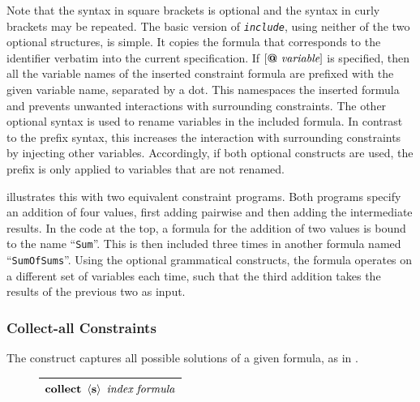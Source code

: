     \noindent
    Note that the syntax in square brackets  is optional and the syntax in curly
    brackets may be repeated.
    The basic version of \texttt{\it include}, using neither of the two optional
    structures, is simple.
    It copies the formula that corresponds to the identifier verbatim into
    the current specification.
    If $[\text{\bf @}\ \text{\it variable}]$ is specified, then all the
    variable names of the inserted constraint formula are prefixed with the
    given variable name, separated by a dot.
    This namespaces the inserted formula and prevents unwanted
    interactions with surrounding constraints.
    The other optional syntax is used to rename variables in the included
    formula.
    In contrast to the prefix syntax, this increases the interaction with
    surrounding constraints by injecting other variables.
    Accordingly, if both optional constructs are used, the prefix is only
    applied to variables that are not renamed.

     illustrates this with two
    equivalent constraint programs.
    Both programs specify an addition of four values, first adding pairwise and
    then adding the intermediate results.
    In the code at the top, a formula for the addition of two values is
    bound to the name ``{\tt Sum}''.
    This is then included three times in another formula named
    ``{\tt SumOfSums}''.
    Using the optional grammatical constructs, the formula operates on a
    different set of variables each time, such that the third addition
    takes the results of the previous two as input.

\begin{figure}[h]

\end{figure}

\subsubsection{Collect-all Constraints}

    The  construct captures all possible solutions of a given
    formula, as in .
\begin{figure}[H]
    \centering
    \begin{tabular}{|c|}
        \hline
        $\text{\bf collect}\ \left<\text{\bf s}\right>\ \text{\it index}\ \text{\it formula}$\\
        \hline
    \end{tabular}
\end{figure}

